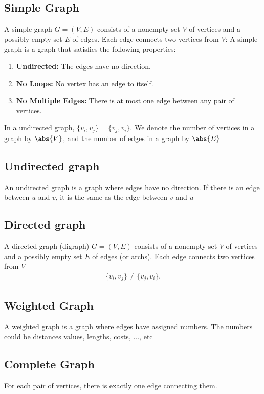 \documentclass{report}
\begin{document}
\subsection{Simple Graph}
\bigbreak \noindent 
A simple graph $G=(V,E)$ consists of a nonempty set $V$ of vertices and a possibly empty set $E$ of edges. Each edge connects two vertices from $V$:
\bigbreak \noindent 
A simple graph is a graph that satisfies the following properties:
\begin{enumerate}
    \item \textbf{Undirected:} The edges have no direction.
    \item \textbf{No Loops:} No vertex has an edge to itself.
    \item \textbf{No Multiple Edges:} There is at most one edge between any pair of vertices.
\end{enumerate}
\bigbreak \noindent 
In a undirected graph, $\{v_{i}, v_{j}\} = \{v_{j}, v_{i}\}$. We denote the number of vertices in a graph by $\abs{V}$, and the number of edges in a graph by $\abs{E}$
\bigbreak \noindent 
\subsection{Undirected graph}
\bigbreak \noindent 
An undirected graph is a graph where edges have no direction. If there is an edge between $u$ and $v$, it is the same as the edge between $v$ and $u$
\bigbreak \noindent 
\subsection{Directed graph}
\bigbreak \noindent 
A directed graph (digraph) $G=(V,E)$ consists of a nonempty set $V$ of vertices and a possibly empty set $E$ of edges (or archs). Each edge connects two vertices from $V$
\begin{align*}
    \{v_{i}, v_{j}\} \ne \{v_{j}, v_{i}\}
.\end{align*}

\bigbreak \noindent 
\subsection{Weighted Graph}
\bigbreak \noindent 
A weighted graph is a graph where edges have assigned numbers. The numbers could be distances values, lengths, costs, ..., etc
\bigbreak \noindent 
\subsection{Complete Graph}
\bigbreak \noindent 
For each pair of vertices, there is exactly one edge connecting them.
\end{document}

